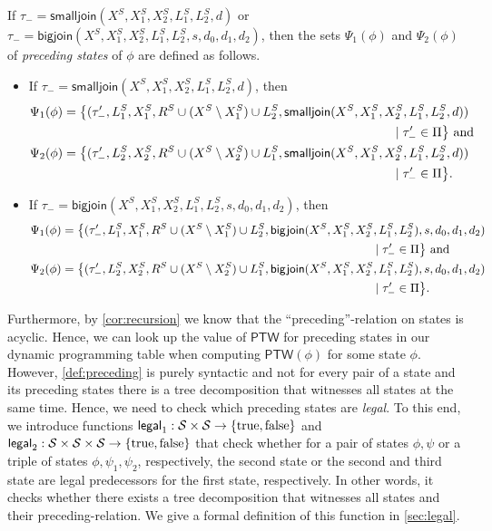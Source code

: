 \documentclass[a4paper,UKenglish,cleveref, autoref, thm-restate, numberwithinsect]{lipics-v2021}
\newcommand{\bigjoin}{\mathsf{bigjoin}}
\newcommand{\smalljoin}{\mathsf{smalljoin}}
\newcommand{\ptw}{\mathsf{PTW}}
\newcommand{\legal}{\mathsf{legal}}
\newcommand{\true}{\textup{true}}
\newcommand{\false}{\textup{false}}
\begin{document}
\begin{definition}
If $\tau_-=\smalljoin(X^S,X_1^S,X_2^S,L_{1}^S, L_{2}^S,d)$ or  $\tau_-=\bigjoin(X^S,X_1^S,X_2^S,L_{1}^S, L_{2}^S,s,d_0,d_1,d_2)$, then the sets $\Psi_1(\phi)$ and $\Psi_2(\phi)$ of \emph{preceding states} of $\phi$ are defined as follows. 
\begin{itemize}
        \item If $\tau_-=\smalljoin(X^S,X_1^S,X_2^S,L_{1}^S, L_{2}^S,d)$, then 
        \begin{align*}
           & \Psi_1(\phi)=\bigl\{(\tau'_-,L^S_1, X_1^S, R^S\cup (X^S \setminus X_1^S)\cup L^S_2,\smalljoin(X^S,X_1^S,X_2^S,L_{1}^S, L_{2}^S,d))\\
            & \hphantom{xxxxxxxxxxxxxxxxxxxxxxxxxxxxxxxxxxxxxxxxxxxxxxxxxx}\mid \tau'_- \in \Pi\bigr\} \text{ and}\\ & \Psi_2(\phi)=\bigl\{(\tau'_-,L^S_2, X_2^S, R^S\cup (X^S \setminus X_2^S)\cup L^S_1,\smalljoin(X^S,X_1^S,X_2^S,L_{1}^S, L_{2}^S,d))\\
            & \hphantom{xxxxxxxxxxxxxxxxxxxxxxxxxxxxxxxxxxxxxxxxxxxxxxxxxx}\mid \tau'_- \in \Pi\bigr\}.
        \end{align*}
        \item If  $\tau_-=\bigjoin(X^S,X_1^S,X_2^S,L_{1}^S, L_{2}^S,s,d_0,d_1,d_2)$, then 
\begin{align*}
            & \Psi_1(\phi)=\bigl\{(\tau'_-,L^S_1, X_1^S, R^S\cup (X^S \setminus X_1^S)\cup L^S_2,\bigjoin(X^S,X_1^S,X_2^S,L_{1}^S, L_{2}^S),s,d_0,d_1,d_2)\\
            & \hphantom{xxxxxxxxxxxxxxxxxxxxxxxxxxxxxxxxxxxxxxxxxxxxxxxxxx}\mid \tau'_- \in \Pi\bigr\} \text{ and}\\ & \Psi_2(\phi)=\bigl\{(\tau'_-,L^S_2, X_2^S, R^S\cup (X^S \setminus X_2^S)\cup L^S_1,\bigjoin(X^S,X_1^S,X_2^S,L_{1}^S, L_{2}^S),s,d_0,d_1,d_2)\\
            & \hphantom{xxxxxxxxxxxxxxxxxxxxxxxxxxxxxxxxxxxxxxxxxxxxxxxxxx}\mid \tau'_- \in \Pi\bigr\}.
        \end{align*}
    \end{itemize}
\end{definition}
Furthermore, by \cref{cor:recursion} we know that the ``preceding''-relation on states is acyclic. Hence, we can look up the value of $\ptw$ for preceding states in our dynamic programming table when computing $\ptw(\phi)$ for some state $\phi$. 
However, \cref{def:preceding} is purely syntactic and not for every pair of a state and its preceding states there is a tree decomposition that witnesses all states at the same time. Hence, we need to check which preceding states are \emph{legal}. To this end, we introduce functions $\legal_1:\mathcal{S}\times\mathcal{S}\rightarrow\{\true,\false\}$ and $\legal_2:\mathcal{S}\times\mathcal{S}\times\mathcal{S}\rightarrow\{\true,\false\}$ that check whether for a pair of states $\phi,\psi$ or a triple of states $\phi,\psi_1,\psi_2$, respectively, the second state or the second and third state are legal predecessors for the first state, respectively. In other words, it checks whether there exists a tree decomposition that witnesses all states and their preceding-relation. We give a formal definition of this function in \cref{sec:legal}.
\end{document}
